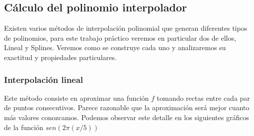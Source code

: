 




\pagebreak

\subsection{Cálculo del polinomio interpolador}

Existen varios métodos de interpolación polinomial que generan diferentes tipos de polinomios, para este trabajo práctico veremos en particular dos de ellos, Lineal y Splines. Veremos como se construye cada uno y analizaremos su exactitud y propiedades particulares.

\subsubsection{Interpolación lineal}

Este método consiste en aproximar una función $f$ tomando rectas entre cada par de puntos consecutivos. Parece razonable que la aproximación será mejor cuanto más valores conozcamos. Podemos observar este detalle en los siguientes gráficos de la función $sen(2\pi(x/5))$ 

